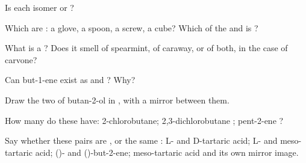 \begin{exercise}[$\star$]\label{exo:g12:stereochemistry:2}
Is each isomer  or ?
\begin{center}
 \qquad
{}
\end{center}
\end{exercise}

\begin{exercise}[$\star$]\label{exo:g12:stereochemistry:3}
Which are : a glove, a spoon, a screw, a cube? Which of the
  and  is ?
\end{exercise}

\begin{exercise}[$\star$]\label{exo:g12:stereochemistry:4}
What is a ? Does it smell of spearmint, of caraway, or of
both, in the case of carvone?
\end{exercise}

\begin{exercise}[$\star$]\label{exo:g12:stereochemistry:5}
Can but-1-ene  exist as  and ? Why?
\end{exercise}

\begin{exercise}[$\star\star$]\label{exo:g12:stereochemistry:6}
Draw the two  of butan-2-ol in , with a
mirror between them.
\end{exercise}

\begin{exercise}[$\star\star$]\label{exo:g12:stereochemistry:7}
How many  do these have: 2-chlorobutane;
2,3-dichlorobutane ; pent-2-ene
?
\end{exercise}

\begin{exercise}[$\star\star$]\label{exo:g12:stereochemistry:8}
Say whether these pairs are ,  or the same
: L- and D-tartaric acid; L- and meso-tartaric acid; ()- and
()-but-2-ene; meso-tartaric acid and its own mirror image.
\end{exercise}

